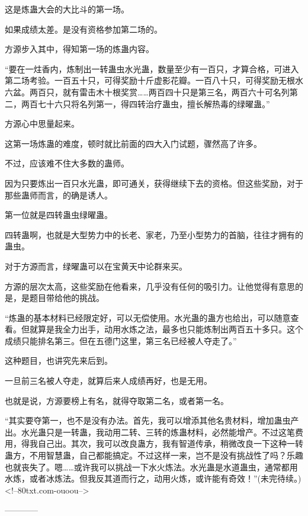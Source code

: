 \begin{this_body}
这是炼蛊大会的大比斗的第一场。

如果成绩太差。是没有资格参加第二场的。

方源步入其中，得知第一场的炼蛊内容。

“要在一炷香内，炼制出一转蛊虫水光蛊，数量至少有一百只，才算合格，可进入第二场考验。一百五十只，可得奖励十斤虚影花瓣。一百八十只，可得奖励无根水六盆。两百只，就有雷击木十根奖赏……两百四十只是第三名，两百六十可名列第二，两百七十六只将名列第一，得四转治疗蛊虫，擅长解热毒的绿曜蛊。”

方源心中思量起来。

这第一场炼蛊的难度，顿时就比前面的四大入门试题，骤然高了许多。

不过，应该难不住大多数的蛊师。

因为只要炼出一百只水光蛊，即可通关，获得继续下去的资格。但这些奖励，对于那些蛊师而言，的确是诱人。

第一位就是四转蛊虫绿曜蛊。

四转蛊啊，也就是大型势力中的长老、家老，乃至小型势力的首脑，往往才拥有的蛊虫。

对于方源而言，绿曜蛊可以在宝黄天中论群来买。

方源的层次太高，这些奖励在他看来，几乎没有任何的吸引力。让他觉得有意思的是，是题目带给他的挑战。

“炼蛊的基本材料已经限定好，可以无偿使用。水光蛊的蛊方也给出，可以随意查看。但就算是我全力出手，动用水炼之法，最多也只能炼制出两百五十多只。这个成绩只能排名第三。但在五德门这里，第三名已经被人夺走了。”

这种题目，也讲究先来后到。

一旦前三名被人夺走，就算后来人成绩再好，也是无用。

也就是说，方源要榜上有名，就得夺取第二名，或者第一名。

“其实要夺第一，也不是没有办法。首先，我可以增添其他名贵材料，增加蛊虫产出。水光蛊只是一转蛊，我动用二转、三转的炼蛊材料，必然能增产。不过这笔费用，得我自己出。其次，我可以改良蛊方，我有智道传承，稍微改良一下这种一转蛊方，不用智慧蛊，自己都能搞定。不过这样一来，岂不是没有挑战性了吗？乐趣也就丧失了。嗯……或许我可以挑战一下水火炼法。水光蛊是水道蛊虫，通常都用水炼，或者冰炼法。但我反其道而行之，动用火炼，或许能有奇效！”(未完待续。)<!--80txt.com-ouoou-->

------------

\end{this_body}

